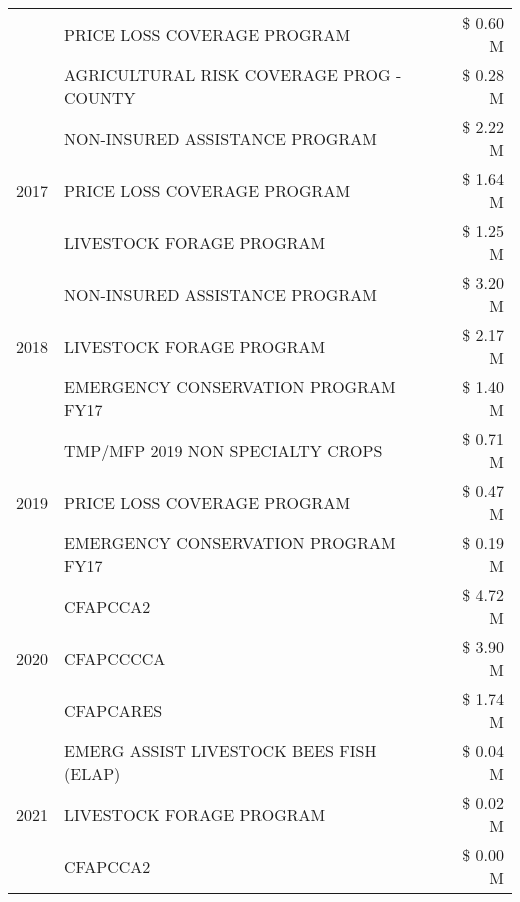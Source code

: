 \begin{tabular}{llr}
 & PRICE LOSS COVERAGE PROGRAM & \$ 0.60 M \\
 & AGRICULTURAL RISK COVERAGE PROG - COUNTY & \$ 0.28 M \\
\cline{1-3}
\multirow[t]{3}{*}{2017} & NON-INSURED ASSISTANCE PROGRAM & \$ 2.22 M \\
 & PRICE LOSS COVERAGE PROGRAM & \$ 1.64 M \\
 & LIVESTOCK FORAGE PROGRAM & \$ 1.25 M \\
\cline{1-3}
\multirow[t]{3}{*}{2018} & NON-INSURED ASSISTANCE PROGRAM & \$ 3.20 M \\
 & LIVESTOCK FORAGE PROGRAM & \$ 2.17 M \\
 & EMERGENCY CONSERVATION PROGRAM FY17 & \$ 1.40 M \\
\cline{1-3}
\multirow[t]{3}{*}{2019} & TMP/MFP 2019 NON SPECIALTY CROPS & \$ 0.71 M \\
 & PRICE LOSS COVERAGE PROGRAM & \$ 0.47 M \\
 & EMERGENCY CONSERVATION PROGRAM FY17 & \$ 0.19 M \\
\cline{1-3}
\multirow[t]{3}{*}{2020} & CFAPCCA2 & \$ 4.72 M \\
 & CFAPCCCCA & \$ 3.90 M \\
 & CFAPCARES & \$ 1.74 M \\
\cline{1-3}
\multirow[t]{3}{*}{2021} & EMERG ASSIST LIVESTOCK BEES FISH (ELAP) & \$ 0.04 M \\
 & LIVESTOCK FORAGE PROGRAM & \$ 0.02 M \\
 & CFAPCCA2 & \$ 0.00 M \\
\cline{1-3}
\bottomrule
\end{tabular}
